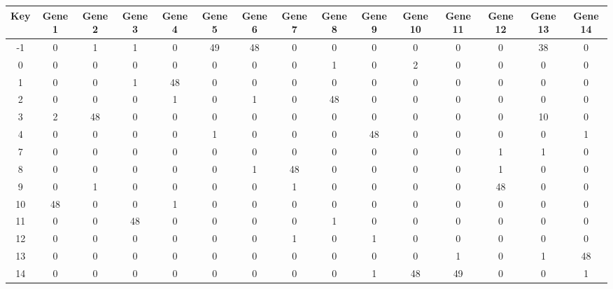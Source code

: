 \begin{tabular}{|c|c|c|c|c|c|c|c|c|c|c|c|c|c|c|}
\hline
Key & Gene 1 & Gene 2 & Gene 3 & Gene 4 & Gene 5 & Gene 6 & Gene 7 & Gene 8 & Gene 9 & Gene 10 & Gene 11 & Gene 12 & Gene 13 & Gene 14 \\
\hline
-1 & 0 & 1 & 1 & 0 & 49 & 48 & 0 & 0 & 0 & 0 & 0 & 0 & 38 & 0 \\
0 & 0 & 0 & 0 & 0 & 0 & 0 & 0 & 1 & 0 & 2 & 0 & 0 & 0 & 0 \\
1 & 0 & 0 & 1 & 48 & 0 & 0 & 0 & 0 & 0 & 0 & 0 & 0 & 0 & 0 \\
2 & 0 & 0 & 0 & 1 & 0 & 1 & 0 & 48 & 0 & 0 & 0 & 0 & 0 & 0 \\
3 & 2 & 48 & 0 & 0 & 0 & 0 & 0 & 0 & 0 & 0 & 0 & 0 & 10 & 0 \\
4 & 0 & 0 & 0 & 0 & 1 & 0 & 0 & 0 & 48 & 0 & 0 & 0 & 0 & 1 \\
7 & 0 & 0 & 0 & 0 & 0 & 0 & 0 & 0 & 0 & 0 & 0 & 1 & 1 & 0 \\
8 & 0 & 0 & 0 & 0 & 0 & 1 & 48 & 0 & 0 & 0 & 0 & 1 & 0 & 0 \\
9 & 0 & 1 & 0 & 0 & 0 & 0 & 1 & 0 & 0 & 0 & 0 & 48 & 0 & 0 \\
10 & 48 & 0 & 0 & 1 & 0 & 0 & 0 & 0 & 0 & 0 & 0 & 0 & 0 & 0 \\
11 & 0 & 0 & 48 & 0 & 0 & 0 & 0 & 1 & 0 & 0 & 0 & 0 & 0 & 0 \\
12 & 0 & 0 & 0 & 0 & 0 & 0 & 1 & 0 & 1 & 0 & 0 & 0 & 0 & 0 \\
13 & 0 & 0 & 0 & 0 & 0 & 0 & 0 & 0 & 0 & 0 & 1 & 0 & 1 & 48 \\
14 & 0 & 0 & 0 & 0 & 0 & 0 & 0 & 0 & 1 & 48 & 49 & 0 & 0 & 1 \\
\hline
\end{tabular}